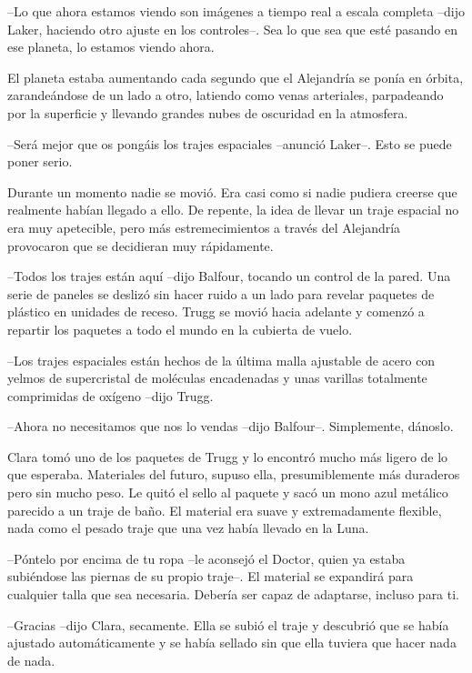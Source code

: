 {--Lo que ahora estamos viendo son imágenes a tiempo real a escala
 completa --dijo Laker, haciendo otro ajuste en los controles--. Sea lo
que sea que esté pasando en ese planeta, lo estamos viendo ahora.}

{El planeta estaba aumentando cada segundo que el Alejandría se ponía en
 órbita, zarandeándose de un lado a otro, latiendo como venas arteriales,
 parpadeando por la superficie y llevando grandes nubes de oscuridad en
la atmosfera.}

{--Será mejor que os pongáis los trajes espaciales --anunció Laker--.
Esto se puede poner serio.}

{Durante un momento nadie se movió. Era casi como si nadie pudiera
 creerse que realmente habían llegado a ello. De repente, la idea de
 llevar un traje espacial no era muy apetecible, pero más
 estremecimientos a través del Alejandría provocaron que se decidieran
muy rápidamente.}

{--Todos los trajes están aquí --dijo Balfour, tocando un control de la
 pared. Una serie de paneles se deslizó sin hacer ruido a un lado para
 revelar paquetes de plástico en unidades de receso. Trugg se movió hacia
 adelante y comenzó a repartir los paquetes a todo el mundo en la
cubierta de vuelo.}

{--Los trajes espaciales están hechos de la última malla ajustable de
 acero con yelmos de supercristal de moléculas encadenadas y unas
varillas totalmente comprimidas de oxígeno --dijo Trugg.}

{--Ahora no necesitamos que nos lo vendas --dijo Balfour--. Simplemente,
dánoslo.}

{Clara tomó uno de los paquetes de Trugg y lo encontró mucho más ligero
 de lo que esperaba. Materiales del futuro, supuso ella, presumiblemente
 más duraderos pero sin mucho peso. Le quitó el sello al paquete y sacó
 un mono azul metálico parecido a un traje de baño. El material era suave
 y extremadamente flexible, nada como el pesado traje que una vez había
llevado en la Luna.}

{--Póntelo por encima de tu ropa --le aconsejó el Doctor, quien ya estaba
 subiéndose las piernas de su propio traje--. El material se expandirá
 para cualquier talla que sea necesaria. Debería ser capaz de adaptarse,
incluso para ti.}

{--Gracias --dijo Clara, secamente. Ella se subió el traje y descubrió
 que se había ajustado automáticamente y se había sellado sin que ella
tuviera que hacer nada de nada.}


